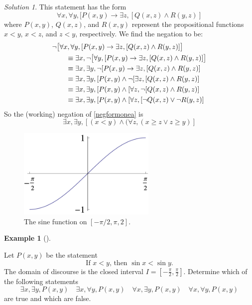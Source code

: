 \documentclass[
  letterpaper,
  10pt,
  reqno,
  twopage,
  openany]{book}
\theoremstyle{plain}
\theoremstyle{definition}
\theoremstyle{definition}
\theoremstyle{definition}
\newtheorem{example}{Example}[chapter]
\theoremstyle{plain}
\theoremstyle{plain}
\theoremstyle{remark}
\newtheorem*{solution}{Solution}
\begin{document}
\begin{solution}

This statement has the form \[
\forall x, \forall y, [ P(x,y)\rightarrow \exists z, [Q(x,z)\land R(y,z)]
\] where \(P(x,y)\), \(Q(x,z)\), and \(R(x,y)\) represent the
propositional functions \(x<y\), \(x<z\), and \(z<y\), respectively. We
find the negation to be: \begin{align*}
& 
\neg \big{[}\forall x, \forall y, [ P(x,y)\rightarrow \exists z, [Q(x,z)\land R(y,z)] \big{]} 
\\
& \qquad 
\equiv 
\exists x, \neg \big{[} \forall y, [ P(x,y)\rightarrow \exists z, [Q(x,z)\land R(y,z)] \big{]} 
\\
& \qquad 
\equiv 
\exists x, \exists y, \neg [ P(x,y)\rightarrow \exists z, [Q(x,z)\land R(y,z)]  
\\
& \qquad 
\equiv 
\exists x, \exists y, [ P(x,y)\land \neg [\exists z, [Q(x,z)\land R(y,z)]  
\\
& \qquad 
\equiv 
\exists x, \exists y, [ P(x,y)\land [\forall z, \neg [Q(x,z)\land R(y,z)]  
\\
& \qquad 
\equiv 
\exists x, \exists y, [ P(x,y)\land [\forall z, [\neg Q(x,z)\lor \neg R(y,z)]  
\end{align*} So the (working) negation of \eqref{negformonea} is
\begin{equation*}
\exists x, \exists y, [ (x < y) \land (\forall z, (x\geq z \lor z\geq y )]  
\end{equation*}

\end{solution}

\begin{figure}

{\centering \includegraphics[width=2.60417in,height=\textheight]{./images/pplot1.png}

}

\caption{\label{fig-sinefunc}The sine function on \([-\pi/2,\pi,2]\).}

\end{figure}

\leavevmode{}%
\begin{example}[]\label{exm-nq-4}

Let \(P(x,y)\) be the statement \[
\text{If $x<y$, then $\sin x < \sin y$.}
\] The domain of discourse is the closed interval
\(I=\left[-\frac{\pi}{2},\frac{\pi}{2}\right]\). Determine which of the
following statements \[
\exists x, \exists y, P(x,y) \quad
\exists x, \forall y, P(x,y) \quad
\forall x, \exists y, P(x,y) \quad
\forall x, \forall y, P(x,y)
\] are true and which are false.

\end{example}
\end{document}
